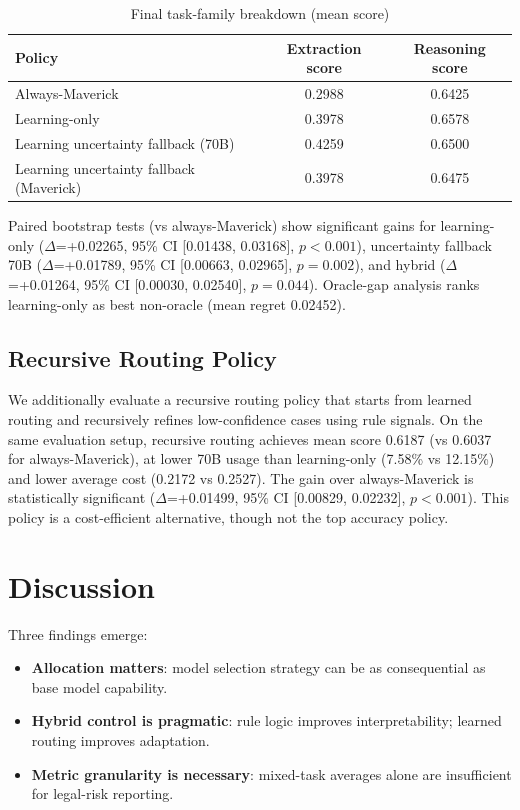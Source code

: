 \begin{table}[H]
\centering
\caption{Final task-family breakdown (mean score)}
\begin{tabular}{lcc}
\toprule
Policy & Extraction score & Reasoning score \\
\midrule
Always-Maverick & 0.2988 & 0.6425 \\
Learning-only & 0.3978 & 0.6578 \\
Learning uncertainty fallback (70B) & 0.4259 & 0.6500 \\
Learning uncertainty fallback (Maverick) & 0.3978 & 0.6475 \\
\bottomrule
\end{tabular}
\end{table}

Paired bootstrap tests (vs always-Maverick) show significant gains for learning-only ($\Delta$=+0.02265, 95\% CI [0.01438, 0.03168], $p<0.001$), uncertainty fallback 70B ($\Delta$=+0.01789, 95\% CI [0.00663, 0.02965], $p=0.002$), and hybrid ($\Delta$=+0.01264, 95\% CI [0.00030, 0.02540], $p=0.044$). Oracle-gap analysis ranks learning-only as best non-oracle (mean regret 0.02452).

\subsection{Recursive Routing Policy}
We additionally evaluate a recursive routing policy that starts from learned routing and recursively refines low-confidence cases using rule signals. On the same evaluation setup, recursive routing achieves mean score 0.6187 (vs 0.6037 for always-Maverick), at lower 70B usage than learning-only (7.58\% vs 12.15\%) and lower average cost (0.2172 vs 0.2527). The gain over always-Maverick is statistically significant ($\Delta$=+0.01499, 95\% CI [0.00829, 0.02232], $p<0.001$). This policy is a cost-efficient alternative, though not the top accuracy policy.

\section{Discussion}
Three findings emerge:
\begin{itemize}[leftmargin=*]
  \item \textbf{Allocation matters}: model selection strategy can be as consequential as base model capability.
  \item \textbf{Hybrid control is pragmatic}: rule logic improves interpretability; learned routing improves adaptation.
  \item \textbf{Metric granularity is necessary}: mixed-task averages alone are insufficient for legal-risk reporting.
\end{itemize}

